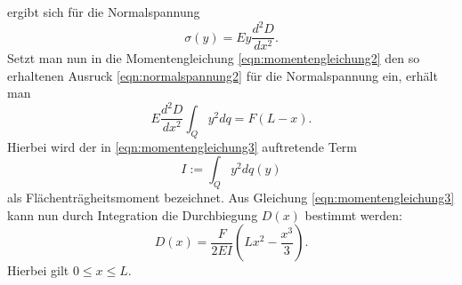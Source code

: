 ergibt sich für die Normalspannung
\begin{equation}
\sigma (y) = E y \frac{d^2 D}{d x^2}.
\label{eqn:normalspannung2}
\end{equation}
Setzt man nun in die Momentengleichung \eqref{eqn:momentengleichung2} den so erhaltenen Ausruck \eqref{eqn:normalspannung2}
für die Normalspannung ein, erhält man
\begin{equation}
  E \frac{d^2 D}{d x^2} \int_Q y^2 dq = F(L - x).
  \label{eqn:momentengleichung3}
\end{equation}
Hierbei wird der in \eqref{eqn:momentengleichung3} auftretende Term
\begin{equation*}
  I := \int_Q y^2 dq(y)
\end{equation*}
als Flächenträgheitsmoment bezeichnet.
Aus Gleichung \eqref{eqn:momentengleichung3} kann nun durch Integration die Durchbiegung $D(x)$ bestimmt
werden:
\begin{equation}
  D(x) = \frac{F}{2 E I} \left( L x^2 - \frac{x^3}{3} \right).
  \label{eqn:durchbiegungeinseitig}
\end{equation}
Hierbei gilt $0 \leq x \leq L$.
